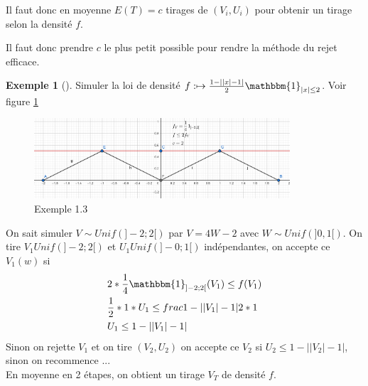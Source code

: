 \documentclass{article}
\theoremstyle{plain}%
\theoremstyle{definition}
\newtheorem{exmp}{Exemple}[section]
\theoremstyle{remark}
\begin{document}
Il faut donc en moyenne $ E(T) = c $ tirages de $(V_i,U_i)$ pour obtenir un tirage selon la densité $ f $. 

Il faut donc prendre $ c $ le plus petit possible pour rendre la méthode du rejet efficace.

\begin{exmp}[]
	Simuler la loi de densité $ f: \mapsto \frac{1-\left| \left| x \right| -1 \right| }{2} \mathbbm{1}_{\left| x \right| \leq 2}$. Voir figure \ref{fig2} \\
	\begin{figure}[!htbp]
		\centering
		\includegraphics[width=0.85\textwidth]{figures2/fig2.png}
		\caption{Exemple 1.3}
		\label{fig2}
	\end{figure}
	On sait simuler $ V \sim Unif(]-2;2[) $ par $ V=4W-2 $ avec $ W \sim Unif(]0,1[) $. On tire $ V_1 Unif(]-2;2[) $  et $ U_1 Unif(]-0;1[) $ indépendantes, on accepte ce $ V_1(w) $ si \begin{align*}
		&2 * \frac{1}{4}\mathbbm{1}_{]-2;2[}(V_1) \leq f(V_1) \\
		& \frac{1}{2}*1*U_1 \leq frac{1-\left| \left| V_1 \right| -1 \right| }{2} *1 \\
		& U_1 \leq 1-\left| \left| V_1 \right| -1 \right| 
	\end{align*}
	Sinon on rejette $ V_1 $ et on tire $ (V_2, U_2) $ on accepte ce $ V_2 $ si $ U_2 \leq 1 - \left| \left| V_2 \right| -1 \right|  $, sinon on recommence ... \\
	En moyenne en 2 étapes, on obtient un tirage $ V_T $ de densité $ f $. 
\end{exmp}
\end{document}
